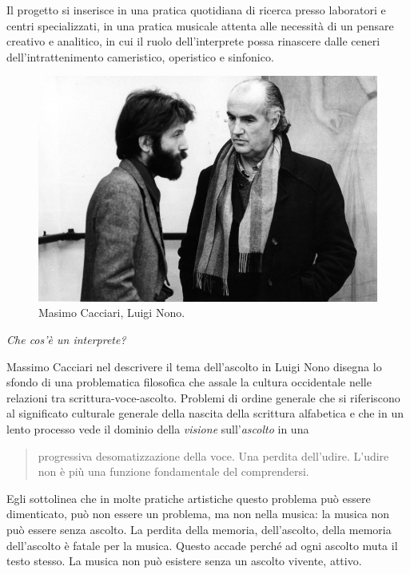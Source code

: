 \documentclass{gs-adonis}
\begin{document}
Il progetto si inserisce in una pratica quotidiana di ricerca presso laboratori
e centri specializzati, in una pratica musicale attenta alle necessità di un pensare creativo e analitico, in cui il ruolo dell'interprete possa rinascere
dalle ceneri dell'intrattenimento cameristico, operistico e sinfonico.

\begin{figure}[ht]
  \centering
  \includegraphics[width=\linewidth]{images/luigi-nono-massimo-cacciari.jpg}
  \captionsetup{width=.81\linewidth}
  \caption{Masimo Cacciari, Luigi Nono.}
  \label{cacciari}
\end{figure}


\emph{Che cos'è un interprete?}

Massimo Cacciari nel descrivere il tema dell'ascolto in Luigi Nono \cite{Cacciari1995} disegna lo sfondo di una problematica filosofica che assale
la cultura occidentale nelle relazioni tra scrittura-voce-ascolto. Problemi di ordine generale che si riferiscono al significato culturale generale della nascita della scrittura alfabetica e che in un lento processo vede il dominio della \emph{visione} sull'\emph{ascolto} in una

\begin{quote}
  progressiva desomatizzazione della voce. Una perdita dell'udire. L'udire
  non è più una funzione fondamentale del comprendersi. \cite{Cacciari1995}
\end{quote}

Egli sottolinea che in molte pratiche artistiche questo problema può essere
dimenticato, può non essere un problema, ma non nella musica: la musica non può
essere senza ascolto. La perdita della memoria, dell'ascolto, della memoria
dell'ascolto è fatale per la musica. Questo accade perché ad ogni ascolto muta
il testo stesso. La musica non può esistere senza un ascolto vivente, attivo.
\end{document}
